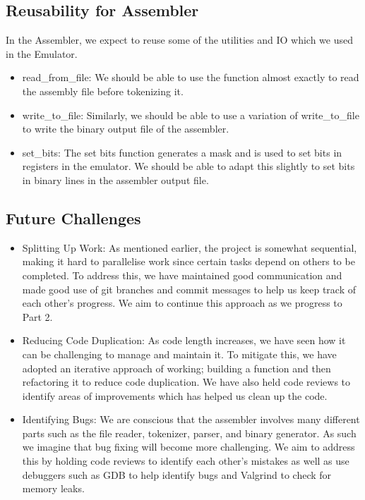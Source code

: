 \documentclass[11pt]{article}
\begin{document}
\subsection*{Reusability for Assembler}
In the Assembler, we expect to reuse some of the utilities and IO which we used in the Emulator. 

\begin{itemize}
    \item read\_from\_file: We should be able to use the function almost exactly to read the assembly file before tokenizing it.
    \item write\_to\_file: Similarly, we should be able to use a variation of write\_to\_file to write the binary output file of the assembler.
    \item set\_bits: The set bits function generates a mask and is used to set bits in registers in the emulator. We should be able to adapt this slightly to set bits in binary lines in the assembler output file.
\end{itemize}

\subsection*{Future Challenges}
\begin{itemize}
    \item Splitting Up Work: As mentioned earlier, the project is somewhat sequential, making it hard to parallelise work since certain tasks depend on others to be completed. 
    To address this, we have maintained good communication and made good use of git branches and commit messages to help us keep track of each other's progress. 
    We aim to continue this approach as we progress to Part 2.
    \item Reducing Code Duplication: As code length increases, we have seen how it can be challenging to manage and maintain it. 
    To mitigate this, we have adopted an iterative approach of working; building a function and then refactoring it to reduce code duplication. 
    We have also held code reviews to identify areas of improvements which has helped us clean up the code.
    \item Identifying Bugs: We are conscious that the assembler involves many different parts such as the file reader, tokenizer, parser, and binary generator. 
    As such we imagine that bug fixing will become more challenging. We aim to address this by holding code reviews to identify each other's mistakes as well as use debuggers 
    such as GDB to help identify bugs and Valgrind to check for memory leaks.
\end{itemize}
\end{document}
